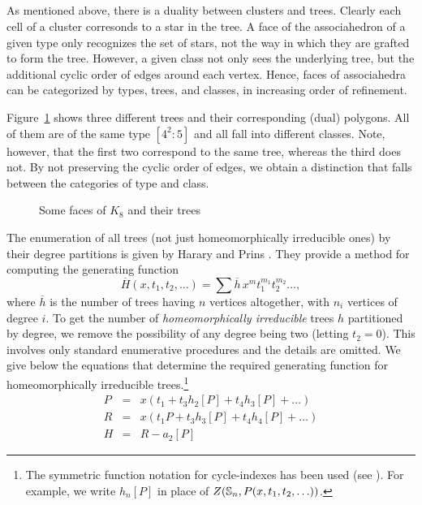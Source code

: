 \documentclass[10pt]{amsart}
\begin{document}
\subsection{}  As mentioned above, there is a duality between clusters and trees.  Clearly each cell of a cluster corresonds to a star in the tree. A face of the associahedron of a given type only recognizes the set of stars, not the way in which they are grafted to form the tree. However, a given class not only sees the underlying tree, but the additional cyclic order of edges around each vertex. Hence, faces of associahedra can be categorized by types, trees, and classes, in increasing order of refinement.

\begin{exmp}
Figure~\ref{phylo} shows three different trees and their corresponding (dual) polygons.  All of them are of the same type $[4^2 : 5]$ and all fall into different classes.  Note, however, that the first two correspond to the same tree, whereas the third does not.  By not preserving the cyclic order of edges, we obtain a distinction that falls between the categories of type and class.
\end{exmp}

\begin{figure}[h]
\caption{Some faces of $K_8$ and their trees}
\label{phylo}
\end{figure}

The enumeration of all trees (not just homeomorphically irreducible ones) by their degree partitions is given by Harary and Prins \cite[\S4]{hpr}.  They provide a method for computing the generating function
$$\overline{H}(x, t_1, t_2, \ldots) = \sum \overline{h} \, x^m t_1^{m_1} t_2^{m_2} \ldots,$$
where $\overline{h}$ is the number of trees having $n$ vertices altogether, with $n_i$ vertices of degree $i$.  To get the number of {\em homeomorphically irreducible} trees $h$ partitioned by degree, we remove the possibility of any degree being two (letting $t_2=0$). This involves only standard enumerative procedures and the details are omitted.  We give below the equations that determine the required generating function for homeomorphically irreducible trees.\footnote{The symmetric function notation for cycle-indexes has been used (see \cite{r0}). For example, we write $h_n[P]$ in place of $Z(\mathbb S_n, P(x, t_1, t_2, \ldots))$.}
\begin{eqnarray*}
P &=& x(t_1 + t_3 h_2[P] + t_4 h_3[P] + \ldots ) \\
R &=& x(t_1 P + t_3 h_3[P] + t_4 h_4[P] + \ldots )\\
H &=& R - a_2[P]
\end{eqnarray*}
\end{document}
